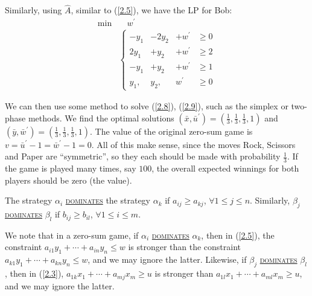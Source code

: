 \begin{example}
    Similarly, using $\hat{A}$, similar to (\ref{2.5}), we have the LP for Bob:
    \begin{align}
        \min & \quad w^{\prime}\nonumber \\
        &\left\lbrace \begin{array}{cccc}
            -y_1 &-2y_2 & +w^{\prime} &\geqslant 0  \\
            2y_1 & +y_2 & + w^{\prime} &\geqslant 2 \\
            -y_1 & +y_2 & + w^{\prime} & \geqslant 1 \\
            y_1, & y_2, & w^{\prime} & \geqslant 0
        \end{array}\right.\label{2.9}
    \end{align}

    We can then use some method to solve (\ref{2.8}), (\ref{2.9}), such as the simplex or two-phase methods. We find the optimal solutions $(\bar{x}, \bar{u}^{\prime}) = \left( \frac{1}{3}, \frac{1}{3}, \frac{1}{3}, 1\right)$ and $(\bar{y}, \bar{w}^{\prime}) = \left( \frac{1}{3}, \frac{1}{3}, \frac{1}{3}, 1\right)$. The value of the original zero-sum game is $v = \bar{u}^{\prime} - 1 = \bar{w}^{\prime} - 1 = 0$. All of this make sense, since the moves Rock, Scissors and Paper are ``symmetric'', so they each should be made with probability $\frac{1}{3}$. If the game is played many times, say $100$, the overall expected winnings for both players should be zero (the value).
\end{example}

\begin{definition}
    The strategy $\alpha_i$ \uline{\textcolor{MarkerColour}{\textsc{dominates}}} the strategy $\alpha_k$ if $a_{ij}\geqslant a_{kj}$, $\forall 1\leqslant j\leqslant n$. Similarly, $\beta_j$ \uline{\textcolor{MarkerColour}{\textsc{dominates}}} $\beta_l$ if $b_{ij}\geqslant b_{il}$, $\forall 1\leqslant i\leqslant m$. 
\end{definition}

We note that in a zero-sum game, if $\alpha_i$ \uline{\textcolor{MarkerColour}{\textsc{dominates}}} $\alpha_k$, then in (\ref{2.5}), the constraint $a_{i1}y_1 + \cdots + a_{in}y_n \leqslant w$ is stronger than the constraint $a_{k1}y_1 + \cdots + a_{kn}y_n \leqslant w$, and we may ignore the latter. Likewise, if $\beta_j$ \uline{\textcolor{MarkerColour}{\textsc{dominates}}} $\beta_l$, then in (\ref{2.3}), $a_{1k}x_1 + \cdots + a_{mj}x_m\geqslant u$ is stronger than $a_{1l}x_1 + \cdots + a_{ml}x_m\geqslant u$, and we may ignore the latter.

